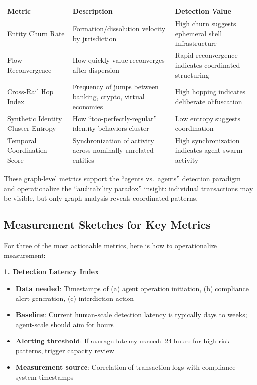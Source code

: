 \documentclass[11pt,letterpaper]{article}
\begin{document}
\begingroup\small
\begin{longtable}{L{0.280\dimexpr{}\tabcolsep\relax}L{0.400\dimexpr{}\tabcolsep\relax}L{0.320\dimexpr{}\tabcolsep\relax}}
\toprule
\textbf{Metric} & \textbf{Description} & \textbf{Detection Value} \\
\midrule
\endhead
Entity Churn Rate & Formation/dissolution velocity by jurisdiction & High churn suggests ephemeral shell infrastructure \\
Flow Reconvergence & How quickly value reconverges after dispersion & Rapid reconvergence indicates coordinated structuring \\
Cross-Rail Hop Index & Frequency of jumps between banking, crypto, virtual economies & High hopping indicates deliberate obfuscation \\
Synthetic Identity Cluster Entropy & How ``too-perfectly-regular'' identity behaviors cluster & Low entropy suggests coordination \\
Temporal Coordination Score & Synchronization of activity across nominally unrelated entities & High synchronization indicates agent swarm activity \\
\bottomrule
\end{longtable}
\endgroup

These graph-level metrics support the ``agents vs.\ agents'' detection paradigm and operationalize the ``auditability paradox'' insight: individual transactions may be visible, but only graph analysis reveals coordinated patterns.

\subsection{Measurement Sketches for Key Metrics}

For three of the most actionable metrics, here is how to operationalize measurement:

\textbf{1. Detection Latency Index}
\begin{itemize}
  \item \textbf{Data needed}: Timestamps of (a) agent operation initiation, (b) compliance alert generation, (c) interdiction action
  \item \textbf{Baseline}: Current human-scale detection latency is typically days to weeks; agent-scale should aim for hours
  \item \textbf{Alerting threshold}: If average latency exceeds 24 hours for high-risk patterns, trigger capacity review
  \item \textbf{Measurement source}: Correlation of transaction logs with compliance system timestamps
\end{itemize}
\end{document}
